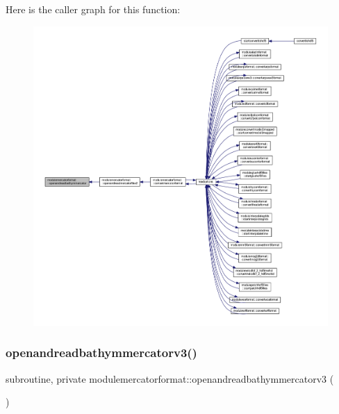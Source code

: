 Here is the caller graph for this function\+:\nopagebreak
\begin{figure}[H]
\begin{center}
\leavevmode
\includegraphics[width=350pt]{namespacemodulemercatorformat_a35d03eb5f2e2fadb8622f62f744f0b97_icgraph}
\end{center}
\end{figure}
\mbox{\label{namespacemodulemercatorformat_a97c77676ac9667492c50594f60e6c907}} 
\subsubsection{\texorpdfstring{openandreadbathymmercatorv3()}{openandreadbathymmercatorv3()}}
{\footnotesize\ttfamily subroutine, private modulemercatorformat\+::openandreadbathymmercatorv3 (\begin{DoxyParamCaption}{ }\end{DoxyParamCaption})\hspace{0.3cm}{\ttfamily [private]}}

